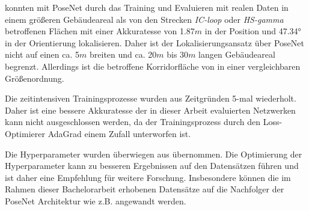 
\citet{walchImageBasedLocalizationUsing2017} konnten mit PoseNet durch das Training und Evaluieren mit realen Daten in einem größeren Gebäudeareal als von den Strecken \textit{IC-loop} oder \textit{HS-gamma} betroffenen Flächen mit einer Akkuratesse von 1.87$m$ in der Position und 47.34° in der Orientierung lokalisieren. Daher ist der Lokalisierungsansatz über PoseNet nicht auf einen ca. 5$m$ breiten und ca. 20$m$ bis 30$m$ langen Gebäudeareal begrenzt. Allerdings ist die betroffene Korridorfläche von \citet{acharyaBIMPoseNetIndoorCamera2019} in einer vergleichbaren Größenordnung.







%






Die zeitintensiven Trainingsprozesse wurden aus Zeitgründen 5-mal wiederholt. Daher ist eine bessere Akkuratesse der in dieser Arbeit evaluierten Netzwerken kann nicht ausgeschlossen werden, da der Trainingsprozess durch den Loss-Optimierer AdaGrad einem Zufall unterworfen ist.

Die Hyperparameter wurden überwiegen aus \citet{acharyaBIMPoseNetIndoorCamera2019} übernommen. Die Optimierung der Hyperparameter kann zu besseren Ergebnissen auf den Datensätzen führen und ist daher eine Empfehlung für weitere Forschung. Insbesondere können die im Rahmen dieser Bachelorarbeit erhobenen Datensätze auf die Nachfolger der PoseNet Architektur wie z.B. \cite{kendallModellingUncertaintyDeep2016, walchImageBasedLocalizationUsing2017, kendallGeometricLossFunctions2017, clarkVidLocDeepSpatioTemporal2017} angewandt werden.


% 

